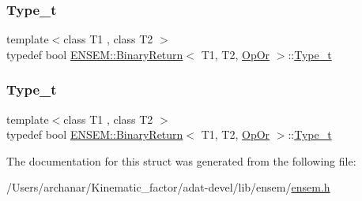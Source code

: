 \mbox{\label{structENSEM_1_1BinaryReturn_3_01T1_00_01T2_00_01OpOr_01_4_acabcdd16b12fa1840e7408d6b811491e}} 
\subsubsection{\texorpdfstring{Type\_t}{Type\_t}\hspace{0.1cm}{\footnotesize\ttfamily [2/3]}}
{\footnotesize\ttfamily template$<$class T1 , class T2 $>$ \\
typedef bool \mbox{\hyperlink{structENSEM_1_1BinaryReturn}{E\+N\+S\+E\+M\+::\+Binary\+Return}}$<$ T1, T2, \mbox{\hyperlink{structENSEM_1_1OpOr}{Op\+Or}} $>$\+::\mbox{\hyperlink{structENSEM_1_1BinaryReturn_3_01T1_00_01T2_00_01OpOr_01_4_acabcdd16b12fa1840e7408d6b811491e}{Type\+\_\+t}}}

\mbox{\label{structENSEM_1_1BinaryReturn_3_01T1_00_01T2_00_01OpOr_01_4_acabcdd16b12fa1840e7408d6b811491e}} 
\subsubsection{\texorpdfstring{Type\_t}{Type\_t}\hspace{0.1cm}{\footnotesize\ttfamily [3/3]}}
{\footnotesize\ttfamily template$<$class T1 , class T2 $>$ \\
typedef bool \mbox{\hyperlink{structENSEM_1_1BinaryReturn}{E\+N\+S\+E\+M\+::\+Binary\+Return}}$<$ T1, T2, \mbox{\hyperlink{structENSEM_1_1OpOr}{Op\+Or}} $>$\+::\mbox{\hyperlink{structENSEM_1_1BinaryReturn_3_01T1_00_01T2_00_01OpOr_01_4_acabcdd16b12fa1840e7408d6b811491e}{Type\+\_\+t}}}



The documentation for this struct was generated from the following file\+:\begin{DoxyCompactItemize}
\item 
/\+Users/archanar/\+Kinematic\+\_\+factor/adat-\/devel/lib/ensem/\mbox{\hyperlink{adat-devel_2lib_2ensem_2ensem_8h}{ensem.\+h}}\end{DoxyCompactItemize}
